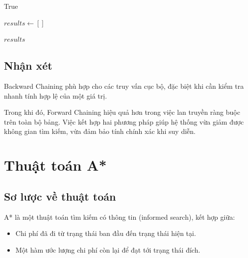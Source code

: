 \begin{algorithm}[H]
\footnotesize
\caption{Kiểm tra giá trị khả thi}



\Return True \;

\end{algorithm}

\begin{algorithm}[H]
\footnotesize
\caption{Truy vấn các giá trị hợp lệ}



$results \leftarrow []$ \;


\Return $results$ \;

\end{algorithm}


\subsection{Nhận xét}

Backward Chaining phù hợp cho các truy vấn cục bộ, đặc biệt khi cần kiểm tra nhanh tính hợp lệ của một giá trị. 

Trong khi đó, Forward Chaining hiệu quả hơn trong việc lan truyền ràng buộc trên toàn bộ bảng. Việc kết hợp hai phương pháp giúp hệ thống vừa giảm được không gian tìm kiếm, vừa đảm bảo tính chính xác khi suy diễn.

\section{Thuật toán A*}

\subsection{Sơ lược về thuật toán}
A* là một thuật toán tìm kiếm có thông tin (informed search), kết hợp giữa:
\begin{itemize}
    \item Chi phí đã đi từ trạng thái ban đầu đến trạng thái hiện tại.
    \item Một hàm ước lượng chi phí còn lại để đạt tới trạng thái đích.
\end{itemize}

